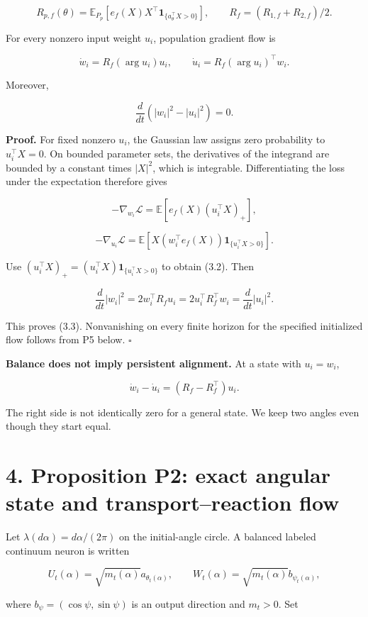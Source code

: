 \documentclass[
  10pt,
]{article}
\begin{document}
\[
 R_{p,f}(\theta)
 =\mathbb E_{P_p}[e_f(X)X^\top\mathbf1_{\{a_\theta^\top X>0\}}],
 \qquad R_f=(R_{1,f}+R_{2,f})/2.
 \tag{3.1}
\]

For every nonzero input weight \(u_i\), population gradient flow is

\[
 \dot w_i=R_f(\arg u_i)u_i,\qquad
 \dot u_i=R_f(\arg u_i)^\top w_i.
 \tag{3.2}
\]

Moreover,

\[
 \frac d{dt}(|w_i|^2-|u_i|^2)=0.
 \tag{3.3}
\]

\textbf{Proof.} For fixed nonzero \(u_i\), the Gaussian law assigns zero
probability to \(u_i^\top X=0\). On bounded parameter sets, the
derivatives of the integrand are bounded by a constant times \(|X|^2\),
which is integrable. Differentiating the loss under the expectation
therefore gives

\[
 -\nabla_{w_i}\mathcal L=\mathbb E[e_f(X)(u_i^\top X)_+],
\]

\[
 -\nabla_{u_i}\mathcal L=\mathbb E[X(w_i^\top e_f(X))\mathbf1_{\{u_i^\top X>0\}}].
\]

Use \((u_i^\top X)_+=(u_i^\top X)\mathbf1_{\{u_i^\top X>0\}}\) to obtain
(3.2). Then

\[
 \frac d{dt}|w_i|^2=2w_i^\top R_fu_i
 =2u_i^\top R_f^\top w_i=\frac d{dt}|u_i|^2.
\]

This proves (3.3). Nonvanishing on every finite horizon for the
specified initialized flow follows from P5 below. \(\square\)

\textbf{Balance does not imply persistent alignment.} At a state with
\(u_i=w_i\),

\[
 \dot w_i-\dot u_i=(R_f-R_f^\top)u_i.
\]

The right side is not identically zero for a general state. We keep two
angles even though they start equal.

\section{4. Proposition P2: exact angular state and transport--reaction
flow}\label{proposition-p2-exact-angular-state-and-transportreaction-flow}

Let \(\lambda(d\alpha)=d\alpha/(2\pi)\) on the initial-angle circle. A
balanced labeled continuum neuron is written

\[
 U_t(\alpha)=\sqrt{m_t(\alpha)}a_{\theta_t(\alpha)},\qquad
 W_t(\alpha)=\sqrt{m_t(\alpha)}b_{\psi_t(\alpha)},
\]

where \(b_\psi=(\cos\psi,\sin\psi)\) is an output direction and
\(m_t>0\). Set
\end{document}
